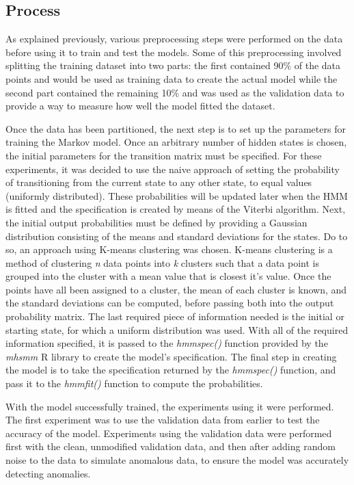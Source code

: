 \documentclass[letterpaper, 11pt]{article}%
\begin{document}
\subsection{Process}
As explained previously, various preprocessing steps were performed on the data before using it to train and test the models. Some of this preprocessing involved splitting the training dataset into two parts: the first contained 90\% of the data points and would be used as training data to create the actual model while the second part contained the remaining 10\% and was used as the validation data to provide a way to measure how well the model fitted the dataset. 

Once the data has been partitioned, the next step is to set up the parameters for training the Markov model. Once an arbitrary number of hidden states is chosen, the initial parameters for the transition matrix must be specified. For these experiments, it was decided to use the naive approach of setting the probability of transitioning from the current state to any other state, to equal values (uniformly distributed). These probabilities will be updated later when the HMM is fitted and the specification is created by means of the Viterbi algorithm. Next, the initial output probabilities must be defined by providing a Gaussian distribution consisting of the means and standard deviations for the states. Do to so, an approach using K-means clustering was chosen. K-means clustering is a method of clustering \textit{n} data points into \textit{k} clusters such that a data point is grouped into the cluster with a mean value that is closest it's value. Once the points have all been assigned to a cluster, the mean of each cluster is known, and the standard deviations can be computed, before passing both into the output probability matrix. The last required piece of information needed is the initial or starting state, for which a uniform distribution was used. With all of the required information specified, it is passed to the \textit{hmmspec()} function provided by the \textit{mhsmm} R library to create the model's specification. The final step in creating the model is to take the specification returned by the \textit{hmmspec()} function, and pass it to the \textit{hmmfit()} function to compute the probabilities.

With the model successfully trained, the experiments using it were performed. The first experiment was to use the validation data from earlier to test the accuracy of the model. Experiments using the validation data were performed first with the clean, unmodified validation data, and then after adding random noise to the data to simulate anomalous data, to ensure the model was accurately detecting anomalies. 
\end{document}
